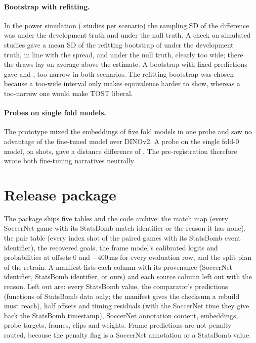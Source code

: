 \documentclass[10pt,twocolumn,letterpaper]{article}
\begin{document}
\paragraph{Bootstrap with refitting.} In the power simulation ( studies per scenario) the sampling SD
of the \Htwo difference was  under the development truth and  under the null truth. A
check on  simulated studies gave a mean SD of the refitting bootstrap of  under the
development truth, in line with the spread, and  under the null truth, clearly too wide; there
the draws lay on average  above the estimate. A bootstrap with fixed predictions gave
 and , too narrow in both scenarios. The refitting bootstrap was chosen
because a too-wide interval only makes equivalence harder to show, whereas a too-narrow one would make TOST liberal.

\paragraph{Probes on single fold models.} The prototype mixed the embeddings of five fold models in one probe and saw
no advantage of the fine-tuned model over DINOv2. A probe on the single fold-0 model, on  shots, gave
a distance difference of . The pre-registration therefore wrote both fine-tuning narratives
neutrally.

\section{Release package}
\label{sec:release}

The package ships five tables and the code archive: the match map (every SoccerNet game with its StatsBomb match
identifier or the reason it has none), the pair table (every index shot of the paired games with its StatsBomb event
identifier), the recovered goals, the frame model's calibrated logits and probabilities at offsets 0 and $-400$\,ms for
every evaluation row, and the split plan of the retrain. A manifest lists each column with its provenance (SoccerNet
identifier, StatsBomb identifier, or ours) and each source column left out with the reason. Left out are: every
StatsBomb value, the comparator's predictions (functions of StatsBomb data only; the manifest gives the checksum a
rebuild must reach), half offsets and timing residuals (with the SoccerNet time they give back the StatsBomb
timestamp), SoccerNet annotation content, embeddings, probe targets, frames, clips and weights. Frame predictions are
not penalty-routed, because the penalty flag is a SoccerNet annotation or a StatsBomb value.
\end{document}
